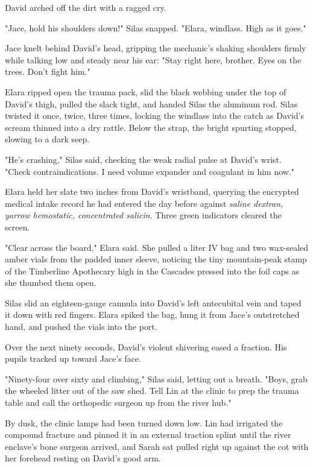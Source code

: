 David arched off the dirt with a ragged cry.

"Jace, hold his shoulders down!" Silas snapped. "Elara, windlass. High as it goes."

Jace knelt behind David's head, gripping the mechanic's shaking shoulders firmly while talking low and steady near his ear: "Stay right here, brother. Eyes on the trees. Don't fight him."

Elara ripped open the trauma pack, slid the black webbing under the top of David's thigh, pulled the slack tight, and handed Silas the aluminum rod. Silas twisted it once, twice, three times, locking the windlass into the catch as David's scream thinned into a dry rattle. Below the strap, the bright spurting stopped, slowing to a dark seep.

"He's crashing," Silas said, checking the weak radial pulse at David's wrist. "Check contraindications. I need volume expander and coagulant in him now."

Elara held her slate two inches from David's wristband, querying the encrypted medical intake record he had entered the day before against \textit{saline dextran, yarrow hemostatic, concentrated salicin}. Three green indicators cleared the screen.

"Clear across the board," Elara said. She pulled a liter IV bag and two wax-sealed amber vials from the padded inner sleeve, noticing the tiny mountain-peak stamp of the Timberline Apothecary high in the Cascades pressed into the foil caps as she thumbed them open.

Silas slid an eighteen-gauge cannula into David's left antecubital vein and taped it down with red fingers. Elara spiked the bag, hung it from Jace's outstretched hand, and pushed the vials into the port.

Over the next ninety seconds, David's violent shivering eased a fraction. His pupils tracked up toward Jace's face.

"Ninety-four over sixty and climbing," Silas said, letting out a breath. "Boys, grab the wheeled litter out of the saw shed. Tell Lin at the clinic to prep the trauma table and call the orthopedic surgeon up from the river hub."

\bigskip

By dusk, the clinic lamps had been turned down low. Lin had irrigated the compound fracture and pinned it in an external traction splint until the river enclave's bone surgeon arrived, and Sarah sat pulled right up against the cot with her forehead resting on David's good arm.

